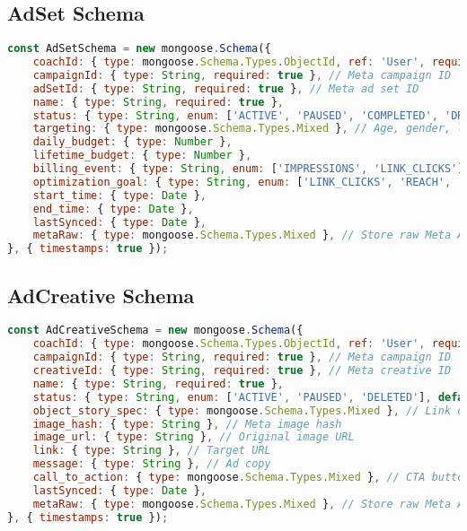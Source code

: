 \documentclass[11pt,a4paper]{article}
\begin{document}
\subsection{AdSet Schema}
\begin{lstlisting}[language=JavaScript]
const AdSetSchema = new mongoose.Schema({
    coachId: { type: mongoose.Schema.Types.ObjectId, ref: 'User', required: true },
    campaignId: { type: String, required: true }, // Meta campaign ID
    adSetId: { type: String, required: true }, // Meta ad set ID
    name: { type: String, required: true },
    status: { type: String, enum: ['ACTIVE', 'PAUSED', 'COMPLETED', 'DRAFT'], default: 'DRAFT' },
    targeting: { type: mongoose.Schema.Types.Mixed }, // Age, gender, location, interests
    daily_budget: { type: Number },
    lifetime_budget: { type: Number },
    billing_event: { type: String, enum: ['IMPRESSIONS', 'LINK_CLICKS'], default: 'IMPRESSIONS' },
    optimization_goal: { type: String, enum: ['LINK_CLICKS', 'REACH', 'IMPRESSIONS', 'LEAD_GENERATION'], default: 'LINK_CLICKS' },
    start_time: { type: Date },
    end_time: { type: Date },
    lastSynced: { type: Date },
    metaRaw: { type: mongoose.Schema.Types.Mixed }, // Store raw Meta API response
}, { timestamps: true });
\end{lstlisting}

\subsection{AdCreative Schema}
\begin{lstlisting}[language=JavaScript]
const AdCreativeSchema = new mongoose.Schema({
    coachId: { type: mongoose.Schema.Types.ObjectId, ref: 'User', required: true },
    campaignId: { type: String, required: true }, // Meta campaign ID
    creativeId: { type: String, required: true }, // Meta creative ID
    name: { type: String, required: true },
    status: { type: String, enum: ['ACTIVE', 'PAUSED', 'DELETED'], default: 'ACTIVE' },
    object_story_spec: { type: mongoose.Schema.Types.Mixed }, // Link data, image, message
    image_hash: { type: String }, // Meta image hash
    image_url: { type: String }, // Original image URL
    link: { type: String }, // Target URL
    message: { type: String }, // Ad copy
    call_to_action: { type: mongoose.Schema.Types.Mixed }, // CTA button
    lastSynced: { type: Date },
    metaRaw: { type: mongoose.Schema.Types.Mixed }, // Store raw Meta API response
}, { timestamps: true });
\end{lstlisting}
\end{document}
